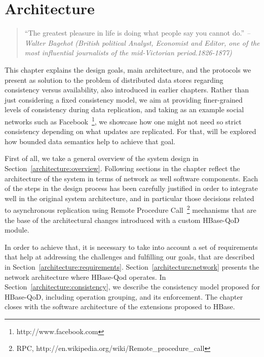 \chapter{Architecture}
\label{ch:architecture}

\begin{quotation}
“The greatest pleasure in life is doing what people say you cannot do.”
{\small\it -- Walter Bagehot (British political Analyst, Economist and Editor, one of the most influential journalists of the mid-Victorian period.1826-1877) }
\end{quotation}

This chapter explains the design goals, main architecture, and the protocols we present as solution to the problem of distributed data stores regarding consistency versus availability, also introduced in earlier chapters. Rather than just considering a fixed consistency model, we aim at providing finer-grained levels of consistency during data replication, and taking as an example social networks such as Facebook~\footnote{http://www.facebook.com}, we showcase how one might not need so strict consistency depending on what updates are replicated. For that, will be explored how bounded data semantics help to achieve that goal.

First of all, we take a general overview of the system design in Section~\ref{architecture:overview}. Following sections in the chapter reflect the architecture of the system in terms of network as well software components. Each of the steps in the design process has been carefully justified in order to integrate well in the original system architecture, and in particular those decisions related to asynchronous replication using Remote Procedure Call~\footnote{RPC, http://en.wikipedia.org/wiki/Remote\_procedure\_call} mechanisms that are the base of the architectural changes introduced with a custom HBase-QoD module.



In order to achieve that, it is necessary to take into account a set of requirements that help at addressing the challenges and fulfilling our goals, that are described  in Section~\ref{architecture:requirements}. Section~\ref{architecture:network} presents the network architecture where HBase-Qod operates. In Section~\ref{architecture:consistency}, we describe the consistency model proposed for HBase-QoD, including operation grouping, and its enforcement. The chapter closes with the software architecture of the extensions proposed to HBase.


